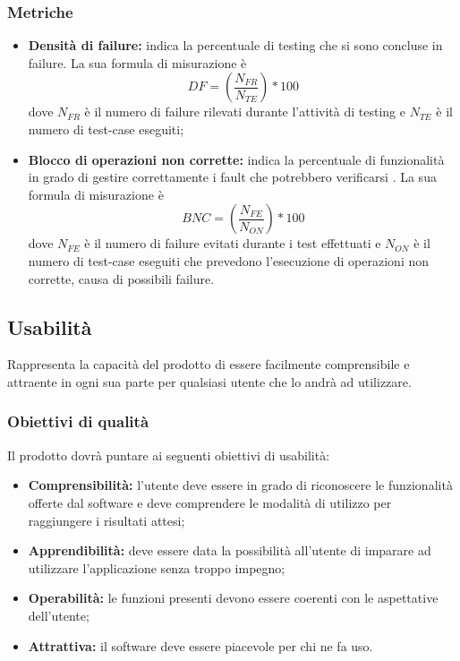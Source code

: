\documentclass[PianoDiQualifica.tex]{subfiles}
\begin{document}
\subsubsection{Metriche}
\begin{itemize}
	\item \textbf{Densità di failure:} indica la percentuale di testing che si sono concluse in failure. La sua formula di misurazione è \[DF=(\frac{N_{FR}}{N_{TE}})*100\] dove $ N_{FR} $ è il numero di failure rilevati durante l'attività di testing e $ N_{TE} $ è il numero di test-case eseguiti;
	\item \textbf{Blocco di operazioni non corrette:} indica la percentuale di funzionalità in grado di gestire correttamente i fault che potrebbero verificarsi . La sua formula di misurazione è \[BNC=(\frac{N_{FE}}{N_{ON}})*100\] dove $ N_{FE} $ è il numero di failure evitati durante i test effettuati e $ N_{ON} $ è il numero di test-case eseguiti che prevedono l'esecuzione di operazioni non corrette, causa di possibili failure.
\end{itemize}
\subsection{Usabilità}
Rappresenta la capacità del prodotto di essere facilmente comprensibile e attraente in ogni sua parte per qualsiasi utente che lo andrà ad utilizzare.
\subsubsection{Obiettivi di qualità}
Il prodotto dovrà puntare ai seguenti obiettivi di usabilità:
\begin{itemize}
	\item \textbf{Comprensibilità:} l'utente deve essere in grado di riconoscere le funzionalità offerte dal software e deve comprendere le modalità di utilizzo per raggiungere i risultati attesi;
	\item \textbf{Apprendibilità:} deve essere data la possibilità all'utente di imparare ad utilizzare l'applicazione senza troppo impegno;
	\item \textbf{Operabilità:} le funzioni presenti devono essere coerenti con le aspettative dell'utente;
	\item \textbf{Attrattiva:} il software deve essere piacevole per chi ne fa uso.
\end{itemize}
\end{document}
